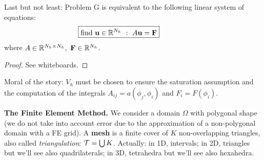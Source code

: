 Last but not least: Problem G is equivalent to the following linear system of equations:
\begin{equation*}
\boxed{\text{find } \mathbf{u}\in\mathbb{R}^{N_h}\ :\ A\mathbf{u}=\mathbf{F}}\qquad\qquad
\end{equation*}
where $A\in\RR^{N_h\times N_h},\ \Fv\in\RR^{N_h}$.

\begin{proof}
See whiteboards.
\end{proof}

Moral of the story: $V_h$ must be chosen to ensure the saturation assumption and the computation of the integrals $A_{ij}=a(\phi_j,\phi_i)$ and $F_i=F(\phi_i)$.

\medskip

\textbf{The Finite Element Method.} We consider a domain $\Omega$ with polygonal shape (we do not take into account error due to the approximation of a non-polygonal domain with a FE grid). A \textbf{mesh} is a finite cover of $K$ non-overlapping triangles, also called \emph{triangulation}: $\mathcal{T}=\bigcup K$. Actually: in 1D, intervals; in 2D, triangles but we'll see also quadrilaterals; in 3D, tetrahedra but we'll see also hexahedra.



\bigskip

\bigskip

\bigskip

\bigskip

\bigskip

\bigskip

\bigskip

\bigskip

\bigskip

\bigskip

\bigskip

\bigskip

\bigskip

\bigskip

\bigskip

\bigskip

\bigskip

\bigskip

\bigskip

\bigskip

\bigskip

\bigskip

\bigskip

\bigskip

\bigskip

\bigskip

\bigskip

